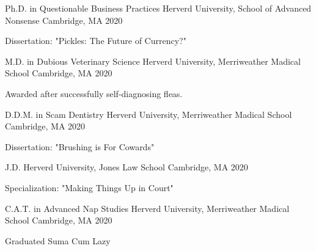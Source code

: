 

\begin{cventries}

  \cventry
    {Ph.D. in Questionable Business Practices} %
    {Herverd University, School of Advanced Nonsense} %
    {Cambridge, MA} %
    {2020} %
    {
      \begin{cvitems} %
        \item {Dissertation: "Pickles: The Future of Currency?"}
      \end{cvitems}
    }
  
  \cventry
    {M.D. in Dubious Veterinary Science} %
    {Herverd University, Merriweather Madical School} %
    {Cambridge, MA} %
    {2020} %
    {
      \begin{cvitems} %
        \item {Awarded after successfully self-diagnosing fleas.}
      \end{cvitems}
    }
    

  \cventry
    {D.D.M. in Scam Dentistry} %
    {Herverd University, Merriweather Madical School} %
    {Cambridge, MA} %
    {2020} %
    {
      \begin{cvitems} %
        \item {Dissertation: "Brushing is For Cowards"}
      \end{cvitems}
    }
    

  \cventry
    {J.D.} %
    {Herverd University, Jones Law School} %
    {Cambridge, MA} %
    {2020} %
    {
      \begin{cvitems} %
        \item {Specialization: "Making Things Up in Court"}
      \end{cvitems}
    }
    

  \cventry
    {C.A.T. in Advanced Nap Studies} %
    {Herverd University, Merriweather Madical School} %
    {Cambridge, MA} %
    {2020} %
    {
      \begin{cvitems} %
        \item {Graduated Suma Cum Lazy}
      \end{cvitems}
    }
  
\end{cventries}
